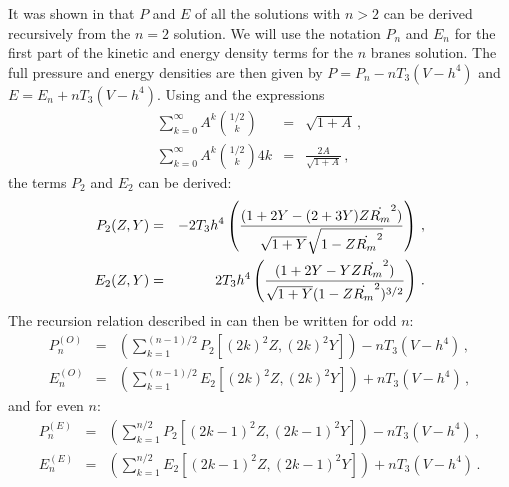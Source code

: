 It was shown in  that $P$ and $E$ of all the solutions with $n>2$
can be derived recursively from the $n=2$ solution. We will use the notation
$P_n$ and $E_n$ for the first part of the kinetic and energy density terms for
the $n$ branes solution. The full pressure and energy densities are then 
given by $P = P_n - nT_3(V-h^4)$ and $E = E_n + nT_3 (V-h^4)$. Using
 and the expressions
% 
\begin{eqnarray}
 \sum_{k=0}^\infty A^k {1/2 \choose k} &=& \sqrt{1+A}\,,\\
 \sum_{k=0}^\infty A^k {1/2 \choose k} 4k &=& \frac{2A}{\sqrt{1+A}}\,,
\end{eqnarray}
% 
the terms $P_2$ and $E_2$ can be derived:
% 
\begin{eqnarray}
\label{eq:2brane}
P_2(Z,Y) &=& - 2 T_3 h^4 \left(\frac{(1+2Y -
(2+3Y)Z\dot{R_m}^2)}{\sqrt{1+Y}\sqrt{1-Z\dot{R_m}^2}}\right) \,, \nonumber \\
E_2(Z,Y) &=& 2 T_3 h^4 \left(\frac{(1+2Y -
YZ\dot{R_m}^2)}{\sqrt{1+Y}(1-Z\dot{R_m}^2)^{3/2}}\right) \,.
\end{eqnarray}
% 
% 
The recursion relation described in  can then be written for odd $n$:
% 
\begin{eqnarray}
\label{eq:oddbrane}
P_n^{(O)} &=& \left(\sum_{k=1}^{(n-1)/2} P_2[(2k)^2Z, (2k)^2Y]
\right)-nT_3(V-h^4) \,, \nonumber \\
E_n^{(O)} &=& \left(\sum_{k=1}^{(n-1)/2} E_2[(2k)^2Z, (2k)^2Y] \right)+
nT_3(V-h^4) \,,
\end{eqnarray}
% 
and for even $n$:
%  
\begin{eqnarray}
\label{eq:evenbrane}
P_n^{(E)} &=& \left(\sum_{k=1}^{n/2} P_2[(2k-1)^2Z, (2k-1)^2Y]
\right)-nT_3(V-h^4) \,, \nonumber \\
E_n^{(E)} &=& \left(\sum_{k=1}^{n/2} E_2[(2k-1)^2Z, (2k-1)^2Y] \right)+
nT_3(V-h^4) \,.
\end{eqnarray}
% 


